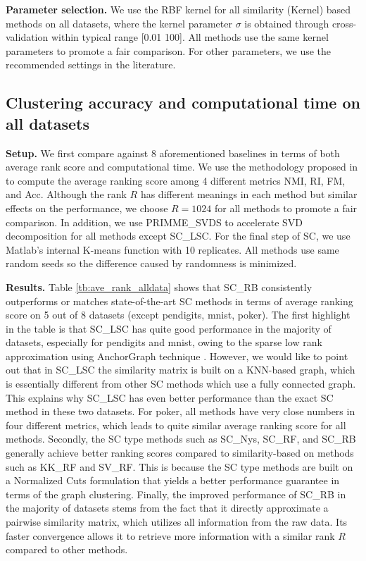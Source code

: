 \documentclass[sigconf]{acmart}
\newcommand{\1}{\boldsymbol{1}}
\newcommand{\0}{\boldsymbol{0}}
\begin{document}
\textbf{Parameter selection.} We use the RBF kernel for all similarity (Kernel) based methods on all datasets, where the kernel parameter $\sigma$ is obtained through cross-validation within typical range [0.01 100]. All methods use the same kernel parameters to promote a fair comparison. For other parameters, we use the recommended settings in the literature. 


\subsection{Clustering accuracy and computational time on all datasets}

\textbf{Setup.} We first compare against 8 aforementioned baselines in terms of both average rank score and computational time. We use the methodology proposed in \cite{yang2015defining} to compute the average ranking score among 4 different metrics NMI, RI, FM, and Acc. Although the rank $R$ has different meanings in each method but similar effects on the performance, we choose $R=1024$ for all methods to promote a fair comparison. In addition, we use PRIMME\_SVDS to accelerate SVD decomposition for all methods except SC\_LSC. For the final step of SC, we use Matlab's internal K-means function with 10 replicates. All methods use same random seeds so the difference caused by randomness is minimized. 

\textbf{Results.} Table \ref{tb:ave_rank_alldata} shows that SC\_RB consistently outperforms or matches state-of-the-art SC methods in terms of average ranking score on 5 out of 8 datasets (except pendigits, mnist, poker). The first highlight in the table is that SC\_LSC has quite good performance in the majority of datasets, especially for pendigits and mnist, owing to the sparse low rank approximation using AnchorGraph technique \cite{liu2010large}. However, we would like to point out that in SC\_LSC the similarity matrix is built on a KNN-based graph, which is essentially different from other SC methods which use a fully connected graph. This explains why SC\_LSC has even better performance than the exact SC method in these two datasets. For poker, all methods have very close numbers in four different metrics, which leads to quite similar average ranking score for all methods. Secondly, the SC type methods such as SC\_Nys, SC\_RF, and SC\_RB generally achieve better ranking scores compared to similarity-based on methods such as KK\_RF and SV\_RF. This is because the SC type methods are built on a Normalized Cuts formulation that yields a better performance guarantee in terms of the graph clustering. Finally, the improved performance of SC\_RB in the majority of datasets stems from the fact that it directly approximate a pairwise similarity matrix, which utilizes all information from the raw data. Its faster convergence allows it to retrieve more information with a similar rank $R$ compared to other methods. 
\end{document}
